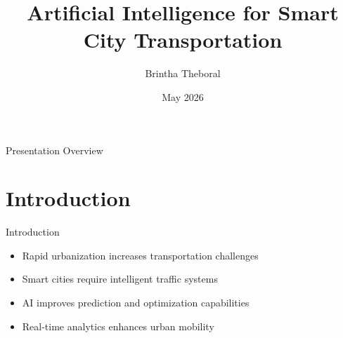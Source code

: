 \documentclass{beamer}
\title{Artificial Intelligence for Smart City Transportation}
\author{Brintha Theboral}
\institute{
	Department of Computer Science Engineering \\
	Global Institute of Technology
}
\date{May 2026}
\begin{document}
	
	
	\begin{frame}
		
		\titlepage
		
	\end{frame}
	
	
	\begin{frame}{Presentation Overview}
		
		\tableofcontents
		
	\end{frame}
	
	
	\section{Introduction}
	
	
	\begin{frame}{Introduction}
		
		\begin{itemize}
			
			\item Rapid urbanization increases transportation challenges
			
			\item Smart cities require intelligent traffic systems
			
			\item AI improves prediction and optimization capabilities
			
			\item Real-time analytics enhances urban mobility
			
		\end{itemize}
		
	\end{frame}
	
	
\end{document}
